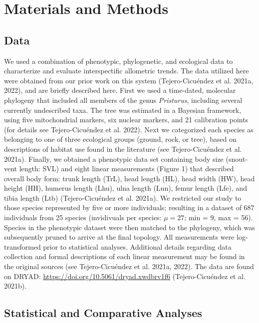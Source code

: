 \documentclass[
]{article}
\begin{document}
\hypertarget{materials-and-methods}{%
\section{Materials and Methods}\label{materials-and-methods}}

\hypertarget{data}{%
\subsection{Data}\label{data}}

We used a combination of phenotypic, phylogenetic, and ecological data
to characterize and evaluate interspectific allometric trends. The data
utilized here were obtained from our prior work on this system
(Tejero-Cicuéndez et al. 2021a, 2022), and are briefly described here.
First we used a time-dated, molecular phylogeny that included all
members of the genus \emph{Pristurus}, including several currently
undescribed taxa. The tree was estimated in a Bayesian framework, using
five mitochondrial markers, six nuclear markers, and 21 calibration
points (for details see Tejero-Cicuéndez et al. 2022). Next we
categorized each species as belonging to one of three ecological groups
(ground, rock, or tree), based on descriptions of habitat use found in
the literature (see Tejero-Cicuéndez et al. 2021a). Finally, we obtained
a phenotypic data set containing body size (snout-vent length: SVL) and
eight linear measurements (Figure 1) that described overall body form:
trunk length (TrL), head length (HL), head width (HW), head height (HH),
humerus length (Lhu), ulna length (Lun), femur length (Lfe), and tibia
length (Ltb) (Tejero-Cicuéndez et al. 2021a). We restricted our study to
those species represented by five or more individuals; resulting in a
dataset of 687 individuals from 25 species (invidivuals per species:
\(\mu=27\); min = 9, max = 56). Species in the phenotypic dataset were
then matched to the phylogeny, which was subsequently pruned to arrive
at the final topology. All measurements were log-transformed prior to
statistical analyses. Additional details regarding data collection and
formal descriptions of each linear measurement may be found in the
original sources (see Tejero-Cicuéndez et al. 2021a, 2022). The data are
found on DRYAD: \url{https://doi.org/10.5061/dryad.xwdbrv1f6}
(Tejero-Cicuéndez et al. 2021b).

\hypertarget{statistical-and-comparative-analyses}{%
\subsection{Statistical and Comparative
Analyses}\label{statistical-and-comparative-analyses}}
\end{document}
